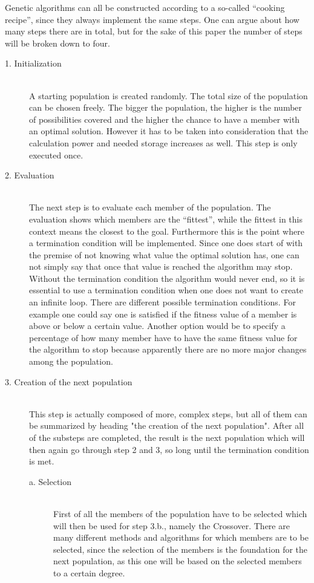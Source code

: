 \documentclass[11pt,a4paper]{article}
\begin{document}
Genetic algorithms can all be constructed according to a so-called “cooking recipe”, since they always implement the same steps. One can argue about how many steps there are in total, but for the sake of this paper the number of steps will be broken down to four.
\begin{description}
\item[1. Initialization] \hfill \\ A starting population is created randomly. The total size of the population can be chosen freely. The bigger the population, the higher is the number of possibilities covered and the higher the chance to have a member with an optimal solution. However it has to be taken into consideration that the calculation power and needed storage increases as well.
This step is only executed once.
\item[2. Evaluation] \hfill \\ The next step is to evaluate each member of the population. The evaluation shows which members are the “fittest”, while the fittest in this context means the closest to the goal.
Furthermore this is the point where a termination condition will be implemented. Since one does start of with the premise of not knowing what value the optimal solution has, one can not simply say that once that value is reached the algorithm may stop. Without the termination condition the algorithm would never end, so it is essential to use a termination condition when one does not want to create an infinite loop. There are different possible termination conditions. For example one could say one is satisfied if the fitness value of a member is above or below a certain value. Another option would be to specify a percentage of how many member have to have the same fitness value for the algorithm to stop because apparently there are no more major changes among the population.
\item[3. Creation of the next population] \hfill \\ This step is actually composed of more, complex steps, but all of them can be summarized by heading "the creation of the next population". After all of the substeps are completed, the result is the next population which will then again go through step 2 and 3, so long until the termination condition is met.
\begin{description}
\item[a. Selection] \hfill \\
First of all the members of the population have to be selected which will then be used for step 3.b., namely the Crossover. There are many different methods and algorithms for which members are to be selected, since the selection of the members is the foundation for the next population, as this one will be based on the selected members to a certain degree.

\end{description}
\end{description}
\end{document}
